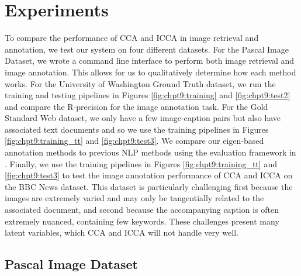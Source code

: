\section{Experiments}\label{sec:results}

To compare the performance of CCA and ICCA in image retrieval and annotation, we test our
system on four different datasets. For the Pascal Image Dataset, we wrote a command line
interface to perform both image retrieval and image annotation. This allows for us to
qualitatively determine how each method works. For the University of Washington Ground
Truth dataset, we run the training and testing pipelines in Figures
\ref{fig:chpt9:training} and \ref{fig:chpt9:test2} and compare the R-precision for the
image annotation task. For the Gold Standard Web dataset, we only have a few image-caption
pairs but also have associated text documents and so we use the training pipelines in
Figures \ref{fig:chpt9:training_tt} and \ref{fig:chpt9:test3}. We compare our eigen-based
annotation methods to previous NLP methods using the evaluation framework in
\cite{leong2010text}. Finally, we use the training pipelines in Figures
\ref{fig:chpt9:training_tt} and \ref{fig:chpt9:test3} to test the image annotation
performance of CCA and ICCA on the BBC News dataset. This dataset is particularly
challenging first because the images are extremely varied and may only be tangentially
related to the associated document, and second because the accompanying caption is often
extremely nuanced, containing few keywords. These challenges present many latent
variables, which CCA and ICCA will not handle very well.

\subsection{Pascal Image Dataset}

